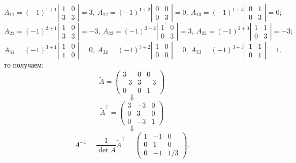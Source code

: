 \documentclass{article}
\begin{document}
$$A_{11}=(-1)^{1+1}\left|\begin{array}{ccc|ccc}1&0\\3&3\end{array}\right|=3,\ A_{12}=(-1)^{1+2}\left|\begin{array}{ccc|ccc}0&0\\0&3\end{array}\right|=0,\ A_{13}=(-1)^{1+3}\left|\begin{array}{ccc|ccc}0&1\\0&3\end{array}\right|=0;$$
$$A_{21}=(-1)^{2+1}\left|\begin{array}{ccc|ccc}1&0\\3&3\end{array}\right|=-3,\ A_{22}=(-1)^{2+2}\left|\begin{array}{ccc|ccc}1&0\\0&3\end{array}\right|=3,\ A_{23}=(-1)^{2+3}\left|\begin{array}{ccc|ccc}1&1\\0&3\end{array}\right|=-3;$$
$$A_{31}=(-1)^{3+1}\left|\begin{array}{ccc|ccc}1&0\\1&0\end{array}\right|=0,\ A_{32}=(-1)^{3+2}\left|\begin{array}{ccc|ccc}1&0\\0&0\end{array}\right|=0,\ A_{33}=(-1)^{3+3}\left|\begin{array}{ccc|ccc}1&1\\0&1\end{array}\right|=1.$$
то получаем:
$$\tilde A = \left(\begin{array}{rrr}3 & 0 & 0\\-3 & 3 & -3\\0 & 0 & 1\end{array}\right)$$
$$\Downarrow$$
$$\tilde A ^{\mathsf{T}} = \left(\begin{array}{rrr}3 & -3 & 0\\0 & 3 & 0\\0 & -3 & 1\end{array}\right)$$
$$\Downarrow$$
$$A^{-1}=\frac{1}{\det A}\tilde A ^{\mathsf{T}}=\left(\begin{array}{ccc}1 & -1 & 0\\ 0 & 1 & 0\\ 0 & -1 & 1/3\end{array}\right).$$
\end{document}
